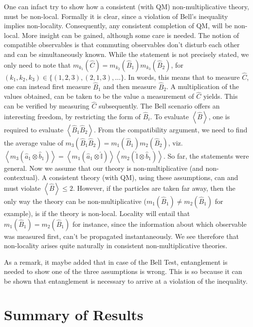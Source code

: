 One can infact try to show how a consistent (with QM) non-multiplicative
theory, must be non-local. Formally it is clear, since a violation
of Bell's inequality implies non-locality. Consequently, any consistent
completion of QM, will be non-local. More insight can be gained, although
some care is needed. The notion of compatible observables is that
commuting observables don't disturb each other and can be simultaneously
known. While the statement is not precisely stated, we only need to
note that $m_{k_{1}}(\hat{C})=m_{k_{2}}(\hat{B}_{1})m_{k_{3}}(\hat{B}_{2})$,
for $(k_{1},k_{2},k_{3})\in\{(1,2,3),(2,1,3),\dots\}$. In words,
this means that to measure $\hat{C}$, one can instead first measure
$\hat{B}_{1}$ and then measure $\hat{B}_{2}$. A multiplication of
the values obtained, can be taken to be the value a measurement of
$\hat{C}$ yields. This can be verified by measuring $\hat{C}$ subsequently.
The Bell scenario offers an interesting freedom, by restricting the
form of $\hat{B}_{i}$. To evaluate $\left\langle \hat{B}\right\rangle $,
one is required to evaluate $\left\langle \hat{B}_{1}\hat{B}_{2}\right\rangle $.
From the compatibility argument, we need to find the average value
of $m_{3}(\hat{B}_{1}\hat{B}_{2})=m_{1}(\hat{B}_{1})m_{2}(\hat{B}_{2})$,
viz. $\left\langle m_{3}(\hat{a}_{1}\otimes\hat{b}_{1})\right\rangle =\left\langle m_{1}(\hat{a}_{1}\otimes\hat{\mathbb{I}})\right\rangle \left\langle m_{2}(\hat{\mathbb{I}}\otimes\hat{b}_{1})\right\rangle $.
So far, the statements were general. Now we assume that our theory
is non-multiplicative (and non-contextual). A consistent theory (with
QM), using these assumptions, can and must violate $\left\langle \hat{B}\right\rangle \le2$.
However, if the particles are taken far away, then the only way the
theory can be non-multiplicative ($m_{1}(\hat{B}_{1})\neq m_{2}(\hat{B}_{1})$
for example), is if the theory is non-local. Locality will entail
that $m_{1}(\hat{B}_{1})=m_{2}(\hat{B}_{1})$ for instance, since
the information about which observable was measured first, can't be
propagated instantaneously. We see therefore that non-locality arises
quite naturally in consistent non-multiplicative theories.

As a remark, it maybe added that in case of the Bell Test, entanglement
is needed to show one of the three assumptions is wrong. This is so
because it can be shown that entanglement is necessary to arrive at
a violation of the inequality.


\section{Summary of Results}

